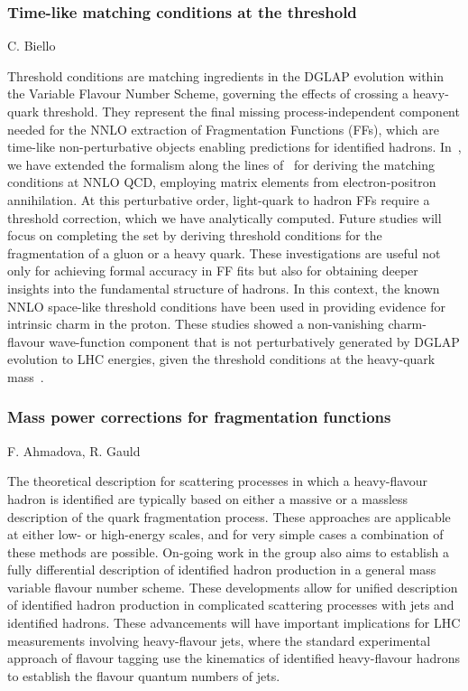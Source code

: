 \documentclass{FBR_Bericht_2025}
\begin{document}
\begin{refsection}
\subsubsection{Time-like matching conditions at the threshold}
\begin{Namen}
C. Biello
\end{Namen}
Threshold conditions are matching ingredients in the DGLAP evolution within the Variable Flavour Number Scheme, governing the effects of crossing a heavy-quark threshold. They represent the final missing process-independent component needed for the NNLO extraction of Fragmentation Functions (FFs), which are time-like non-perturbative objects enabling predictions for identified hadrons. In~, we have extended the formalism along the lines of~ for deriving the matching conditions at NNLO QCD, employing matrix elements from electron-positron annihilation. At this perturbative order, light-quark to hadron FFs require a threshold correction, which we have analytically computed. Future studies will focus on completing the set by deriving threshold conditions for the fragmentation of a gluon or a heavy quark. These investigations are useful not only for achieving formal accuracy in FF fits but also for obtaining deeper insights into the fundamental structure of hadrons. In this context, the known NNLO space-like threshold conditions have been used in providing evidence for intrinsic charm in the proton. These studies showed a non-vanishing charm-flavour wave-function component that is not perturbatively generated by DGLAP evolution to LHC energies, given the threshold conditions at the heavy-quark mass~\cite{Ball:2022qks}.
%
\subsubsection{Mass power corrections for fragmentation functions}
\begin{Namen}
F. Ahmadova, R. Gauld
\end{Namen}
The theoretical description for scattering processes in which a heavy-flavour hadron is identified are typically based on either a massive or a massless description of the quark fragmentation process. These approaches are applicable at either low- or high-energy scales, and for very simple cases a combination of these methods are possible.
On-going work in the group also aims to establish a fully differential description of identified hadron production in a general mass variable flavour number scheme. These developments allow for unified description of identified hadron production in complicated scattering processes with jets and identified hadrons.
These advancements will have important implications for LHC measurements involving heavy-flavour jets, where the standard experimental approach of flavour tagging use the kinematics of identified heavy-flavour hadrons to establish the flavour quantum numbers of jets.
%

\end{refsection}
\end{document}
